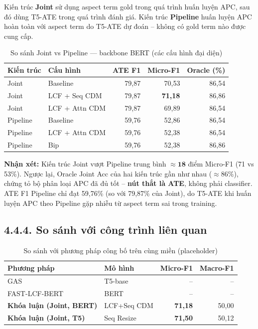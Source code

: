 Kiến trúc \textbf{Joint} sử dụng aspect term gold trong quá trình huấn
luyện APC, sau đó dùng T5-ATE trong quá trình đánh giá.
Kiến trúc \textbf{Pipeline} huấn luyện APC hoàn toàn với aspect term
do T5-ATE dự đoán -- không có gold term nào được cung cấp.

\begin{table}[H]
\centering
\small
\caption{So sánh Joint vs Pipeline — backbone BERT (các cấu hình đại diện)}
\label{tab:joint_vs_pipeline}
\begin{tabular}{@{}llrrr@{}}
\toprule
\textbf{Kiến trúc} & \textbf{Cấu hình} & \textbf{ATE F1} & \textbf{Micro-F1} & \textbf{Oracle (\%)} \\
\midrule
Joint    & Baseline          & 79,87 & 70,53 & 86,54 \\
Joint    & LCF + Seq CDM     & 79,87 & \textbf{71,18} & 86,86 \\
Joint    & LCF + Attn CDM    & 79,87 & 69,89 & 86,54 \\
\midrule
Pipeline & Baseline          & 59,76 & 52,86 & 86,54 \\
Pipeline & LCF + Attn CDM    & 59,76 & 52,38 & 86,54 \\
Pipeline & Bip               & 59,76 & 52,38 & 86,86 \\
\bottomrule
\end{tabular}
\end{table}

\textbf{Nhận xét:} Kiến trúc Joint vượt Pipeline trung bình
$\approx\mathbf{18}$ điểm Micro-F1 (71 vs 53\%). Ngược lại,
Oracle Joint Acc của hai kiến trúc gần như nhau ($\approx86\%$),
chứng tỏ bộ phân loại APC đã đủ tốt -- \textbf{nút thắt là ATE},
không phải classifier. ATE F1 Pipeline chỉ đạt 59,76\% (so với 79,87\%
của Joint), do T5-ATE khi huấn luyện APC theo Pipeline gặp nhiễu
từ aspect term sai trong training.

\subsection{4.4.4.\; So sánh với công trình liên quan}
\label{subsec:paper_comparison}

\begin{table}[H]
\centering
\small
\caption{So sánh với phương pháp công bố trên cùng miền (placeholder)}
\label{tab:paper_comparison}
\begin{tabular}{@{}llrr@{}}
\toprule
\textbf{Phương pháp} & \textbf{Mô hình} & \textbf{Micro-F1} & \textbf{Macro-F1} \\
\midrule
GAS \cite{zhang2021gas}                 & T5-base  & -- & -- \\
FAST-LCF-BERT \cite{zeng2019lcf}        & BERT     & -- & -- \\
\midrule
\textbf{Khóa luận (Joint, BERT)}  & LCF+Seq CDM   & \textbf{71,18} & 50,00 \\
\textbf{Khóa luận (Joint, T5)}    & Seq Resize    & \textbf{71,50} & 50,12 \\
\bottomrule
\end{tabular}
\end{table}

